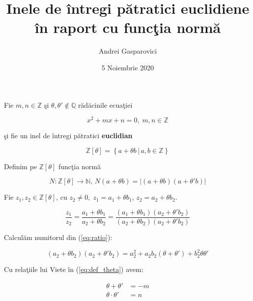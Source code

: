 \documentclass[12t]{article}
\title{Inele de întregi pătratici euclidiene în raport cu funcţia normă}
\author{Andrei Gasparovici}
\date{5 Noiembrie 2020}
\begin{document}
\maketitle

Fie $m, n \in \mathbb{Z}$ şi $\theta, \theta' \notin \mathbb{Q}$ rădăcinile ecuaţiei

\begin{equation} \label{eq:def_theta}
    x^2 + mx + n = 0, \; m, n \in \mathbb{Z}
\end{equation}

şi fie un inel de întregi pătratici \textbf{euclidian}

\begin{equation} \label{eq:def_z_theta}
    \mathbb{Z}[\theta] = \left\{ a + \theta b \,|\, a, b \in \mathbb{Z}\right\}
\end{equation}

Definim pe $\mathbb{Z[\theta]}$ funcţia normă

\begin{equation} \label{eq:def_norm}
    N : \mathbb{Z[\theta]} \to \mathbb{N}, \, N(a + \theta b) = |(a + \theta b)(a + \theta' b)|
\end{equation}

Fie $z_1, z_2 \in \mathbb{Z}[\theta]$, cu $z_2 \neq 0, \; z_1 = a_1 + \theta b_1$, $z_2 = a_2 + \theta b_2$.

\begin{equation} \label{eq:ratio}
    \frac{z_1}{z_2} = \frac{a_1 + \theta b_1}{a_2 + \theta b_2} = 
    \frac{(a_1 + \theta b_1)(a_2 + \theta' b_2)}{(a_2 + \theta b_2)(a_2 + \theta' b_2)}
\end{equation}

Calculăm numitorul din (\ref{eq:ratio}):

\begin{equation} \label{eq:ratio_denominator}
    (a_2 + \theta b_2)(a_2 + \theta' b_2) = a_2^2 + a_2b_2(\theta + \theta') + b_2^2\theta\theta'
\end{equation}

Cu relaţiile lui Viete în (\ref{eq:def_theta}) avem:

\begin{equation} \label{eq:viete}
    \begin{array}{ll}
    \theta + \theta' &= -m \\
    \theta \cdot \theta' &= n \\
    \end{array}
\end{equation}
\end{document}
